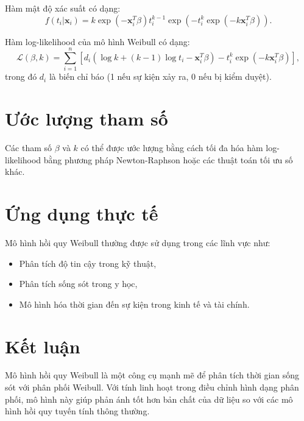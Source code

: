 Hàm mật độ xác suất có dạng:
\begin{equation}
    f(t_i | \mathbf{x}_i) = k \exp(- \mathbf{x}_i^T \beta) t_i^{k-1} \exp \left( - t_i^k \exp(- k \mathbf{x}_i^T \beta) \right).
\end{equation}

Hàm log-likelihood của mô hình Weibull có dạng:
\begin{equation}
    \mathcal{L}(\beta, k) = \sum_{i=1}^{n} \left[ d_i \left( \log k + (k-1) \log t_i - \mathbf{x}_i^T \beta \right) - t_i^k \exp(- k \mathbf{x}_i^T \beta) \right],
\end{equation}
trong đó $d_i$ là biến chỉ báo (1 nếu sự kiện xảy ra, 0 nếu bị kiểm duyệt).

\section{Ước lượng tham số}
Các tham số $\beta$ và $k$ có thể được ước lượng bằng cách tối đa hóa hàm log-likelihood bằng phương pháp Newton-Raphson hoặc các thuật toán tối ưu số khác.

\section{Ứng dụng thực tế}
Mô hình hồi quy Weibull thường được sử dụng trong các lĩnh vực như:
\begin{itemize}
    \item Phân tích độ tin cậy trong kỹ thuật,
    \item Phân tích sống sót trong y học,
    \item Mô hình hóa thời gian đến sự kiện trong kinh tế và tài chính.
\end{itemize}

\section{Kết luận}
Mô hình hồi quy Weibull là một công cụ mạnh mẽ để phân tích thời gian sống sót với phân phối Weibull. Với tính linh hoạt trong điều chỉnh hình dạng phân phối, mô hình này giúp phản ánh tốt hơn bản chất của dữ liệu so với các mô hình hồi quy tuyến tính thông thường.
